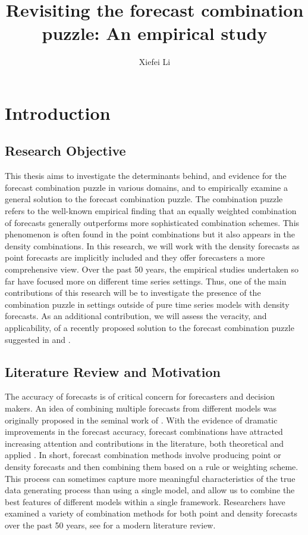 \documentclass{monashthesis}
\author{Xiefei Li}
\title{Revisiting the forecast combination puzzle: An empirical study}
\begin{document}

\titlepage

{\sf\tighttoc\doublespacing}

\clearpage{}\setcounter{page}{1}

\hypertarget{introduction}{%
\chapter{Introduction}\label{introduction}}

\hypertarget{research-objective}{%
\section{Research Objective}\label{research-objective}}

This thesis aims to investigate the determinants behind, and evidence for the forecast combination puzzle in various domains, and to empirically examine a general solution to the forecast combination puzzle. The combination puzzle refers to the well-known empirical finding that an equally weighted combination of forecasts generally outperforms more sophisticated combination schemes. This phenomenon is often found in the point combinations but it also appears in the density combinations. In this research, we will work with the density forecasts as point forecasts are implicitly included and they offer forecasters a more comprehensive view. Over the past 50 years, the empirical studies undertaken so far have focused more on different time series settings. Thus, one of the main contributions of this research will be to investigate the presence of the combination puzzle in settings outside of pure time series models with density forecasts. As an additional contribution, we will assess the veracity, and applicability, of a recently proposed solution to the forecast combination puzzle suggested in \textcite{ZMFP22} and \textcite{FZMP23}.

\hypertarget{literature-review-and-motivation}{%
\section{Literature Review and Motivation}\label{literature-review-and-motivation}}

The accuracy of forecasts is of critical concern for forecasters and decision makers. An idea of combining multiple forecasts from different models was originally proposed in the seminal work of \textcite{BG69}. With the evidence of dramatic improvements in the forecast accuracy, forecast combinations have attracted increasing attention and contributions in the literature, both theoretical and applied \autocite{C89,T06}. In short, forecast combination methods involve producing point or density forecasts and then combining them based on a rule or weighting scheme. This process can sometimes capture more meaningful characteristics of the true data generating process than using a single model, and allow us to combine the best features of different models within a single framework. Researchers have examined a variety of combination methods for both point and density forecasts over the past 50 years, see \textcite{WHLK22} for a modern literature review.
\end{document}
